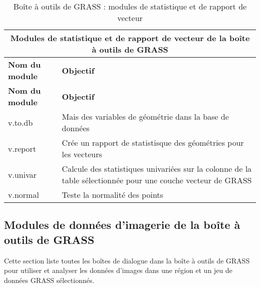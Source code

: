 \begin{table}[H]
\centering
 \begin{tabular}{|p{3cm}|p{11cm}|}
  \hline \multicolumn{2}{|c|}{\textbf{Modules de statistique et de rapport de vecteur de la boîte à outils de GRASS}} \\
  \hline \textbf{Nom du module} & \textbf{Objectif} \\
  \hline \textbf{Nom du module} & \textbf{Objectif} \\
  \hline v.to.db & Mais des variables de géométrie dans la base de données\\
  \hline v.report & Crée un rapport de statistisque des géométries pour les vecteurs\\
  \hline v.univar & Calcule des statistiques univariées sur la colonne de la table sélectionnée pour une couche vecteur de GRASS\\
  \hline v.normal & Teste la normalité des points\\
\hline
\end{tabular}
\caption{Boîte à outils de GRASS : modules de statistique et de rapport de vecteur}
\end{table}

\subsection{Modules de données d'imagerie de la boîte à outils de GRASS}

Cette section liste toutes les boîtes de dialogue dans la boîte à outils de GRASS pour utiliser et analyser les données d'images dans une région et un jeu de données GRASS sélectionnés.

